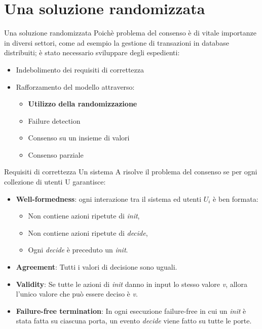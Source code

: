 \documentclass{beamer}
\begin{document}


    \section{Una soluzione randomizzata}

    \begin{frame}{Una soluzione randomizzata}
        Poichè problema del consenso è di vitale importanze in diversi settori, come ad esempio la gestione di transazioni in database distribuiti; è stato necessario sviluppare degli espedienti:
        \vspace{0.2cm}
        \begin{itemize}
            \item Indebolimento dei requisiti di correttezza
            \item Rafforzamento del modello attraverso:
            \vspace{0.2cm}

            \begin{itemize}
                \item \textbf{Utilizzo della randomizzazione}
                \item Failure detection
                \item Consenso su un insieme di valori
                \item Consenso parziale
            \end{itemize}
        \end{itemize}
    \end{frame}

    \begin{frame}{Requisiti di correttezza}
        Un sistema A risolve il problema del consenso se per ogni collezione di utenti U garantisce:
        \begin{itemize}
            \item \textbf{Well-formedness}: ogni interazione tra il sistema ed utenti $U_{i}$ è ben formata:
            \begin{itemize}
                \item Non contiene azioni ripetute di \textit{init},
                \item Non contiene azioni ripetute di \textit{decide},
                \item Ogni \textit{decide} è preceduto un \textit{init}.
            \end{itemize}
            \item \textbf{Agreement}: Tutti i valori di decisione sono uguali.
            \item \textbf{Validity}: Se tutte le azioni di \textit{init} danno in input lo stesso valore \textit{v}, allora l'unico valore che può essere deciso è \textit{v}.
            \item \textbf{Failure-free termination}: In ogni esecuzione failure-free in cui un \textit{init} è stata fatta su ciascuna porta, un evento \textit{decide} viene fatto su tutte le porte.
        \end{itemize}
    \end{frame}
\end{document}
